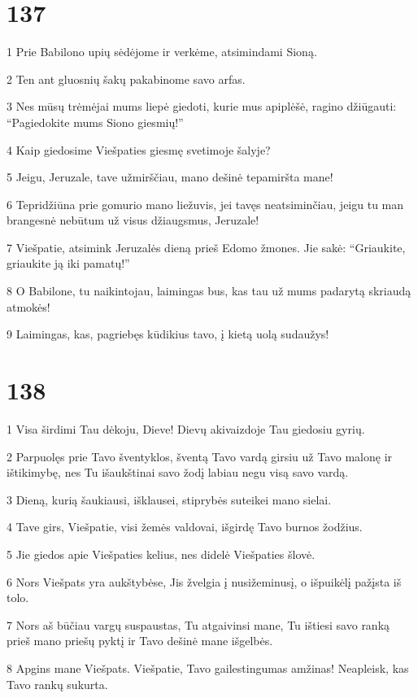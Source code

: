 \chapter{137}


\par 1 Prie Babilono upių sėdėjome ir verkėme, atsimindami Sioną. 
\par 2 Ten ant gluosnių šakų pakabinome savo arfas. 
\par 3 Nes mūsų trėmėjai mums liepė giedoti, kurie mus apiplėšė, ragino džiūgauti: “Pagiedokite mums Siono giesmių!” 
\par 4 Kaip giedosime Viešpaties giesmę svetimoje šalyje? 
\par 5 Jeigu, Jeruzale, tave užmirščiau, mano dešinė tepamiršta mane! 
\par 6 Tepridžiūna prie gomurio mano liežuvis, jei tavęs neatsiminčiau, jeigu tu man brangesnė nebūtum už visus džiaugsmus, Jeruzale! 
\par 7 Viešpatie, atsimink Jeruzalės dieną prieš Edomo žmones. Jie sakė: “Griaukite, griaukite ją iki pamatų!” 
\par 8 O Babilone, tu naikintojau, laimingas bus, kas tau už mums padarytą skriaudą atmokės! 
\par 9 Laimingas, kas, pagriebęs kūdikius tavo, į kietą uolą sudaužys!


\chapter{138}


\par 1 Visa širdimi Tau dėkoju, Dieve! Dievų akivaizdoje Tau giedosiu gyrių. 
\par 2 Parpuolęs prie Tavo šventyklos, šventą Tavo vardą girsiu už Tavo malonę ir ištikimybę, nes Tu išaukštinai savo žodį labiau negu visą savo vardą. 
\par 3 Dieną, kurią šaukiausi, išklausei, stiprybės suteikei mano sielai. 
\par 4 Tave girs, Viešpatie, visi žemės valdovai, išgirdę Tavo burnos žodžius. 
\par 5 Jie giedos apie Viešpaties kelius, nes didelė Viešpaties šlovė. 
\par 6 Nors Viešpats yra aukštybėse, Jis žvelgia į nusižeminusį, o išpuikėlį pažįsta iš tolo. 
\par 7 Nors aš būčiau vargų suspaustas, Tu atgaivinsi mane, Tu ištiesi savo ranką prieš mano priešų pyktį ir Tavo dešinė mane išgelbės. 
\par 8 Apgins mane Viešpats. Viešpatie, Tavo gailestingumas amžinas! Neapleisk, kas Tavo rankų sukurta.


